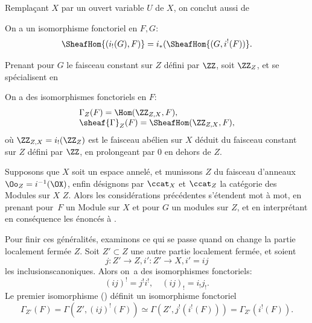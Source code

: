 Rempla\c cant $X$ par un ouvert variable $U$ de $X$, on conclut
aussi de 

\begin{corollaire} \label{I.1.5} On a un isomorphisme fonctoriel en $F, G$:
\begin{equation} \label{eq:I.11}
\SheafHom{(i_!(G), F)} =i_*(\SheafHom{(G, i^!(F))}.
\end{equation}
\end{corollaire}

Prenant pour $G$ le faisceau constant sur $Z$ d\'efini par $\ZZ$, soit $\ZZ_Z$,  et  se sp\'ecialisent en

\begin{corollaire} \label{I.1.6} On a des isomorphismes fonctoriels en $F$:
\begin{equation} \label{eq:I.12}
\begin{array}[c]{l} {\Gamma_Z(F)=\Hom(\ZZ_{Z, X}, F)}, \\
{\sheaf{\Gamma}_Z(F)=\SheafHom(\ZZ_{Z, X}, F)},
\end{array}
\end{equation}
o\`u $\ZZ_{Z, X}= i_!(\ZZ_Z)$ est le faisceau ab\'elien sur $X$ d\'eduit du faisceau constant sur $Z$ d\'efini par $\ZZ$, en prolongeant par $0$ en dehors de $Z$.
\end{corollaire}

\begin{remarque} \label{I.1.7}
Supposons que $X$ soit un espace annel\'e, et munissons $Z$ du faisceau d'anneaux $\Oo_Z=i^{-1}(\OX)$, enfin d\'esignons par $\ccat_X$ et $\ccat_Z$ la cat\'egorie des Modules sur $X$ \resp $Z$. Alors les consid\'erations pr\'ec\'edentes s'\'etendent mot \`a mot, en prenant pour~$F$ un Module sur $X$ et pour $G$ un modules sur $Z$, et en interpr\'etant en cons\'equence les \'enonc\'es  \`a .
\end{remarque}

Pour finir ces g\'en\'eralit\'es, examinons ce qui se passe quand on change la partie localement ferm\'ee $Z$. Soit $Z'\subset Z$ une autre partie localement ferm\'ee, et soient
$$j: Z' \to Z, i': Z' \to X, i'=ij$$
les inclusions\pageoriginale canoniques. Alors on~a des isomorphismes fonctoriels:
\begin{equation} \label{eq:I.13} {(ij)^!=j^!i^!, \quad (ij)_!=i_!j_!}.
\end{equation}
Le premier isomorphisme () d\'efinit un isomorphisme fonctoriel
\begin{equation} \label{eq:I.14} {\Gamma_{Z'}(F)=\Gamma(Z', (ij)^!(F))\simeq \Gamma(Z', j^!(i^!(F)))=\Gamma_{Z'}(i^!(F))}.
\end{equation}


